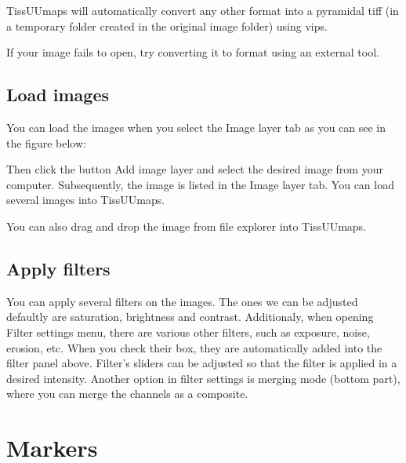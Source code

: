 \documentclass[letterpaper,10pt,english,openany,oneside]{sphinxmanual}
\begin{document}
\sphinxAtStartPar
TissUUmaps will automatically convert any other format into a pyramidal tiff (in a temporary  folder created in the original image folder) using vips.

\sphinxAtStartPar
If your image fails to open, try converting it to  format using an external tool.


\subsection{Load images}
\label{\detokenize{docs/starting/images:load-images}}
\sphinxAtStartPar
You can load the images when you select the Image layer tab as you can see in the figure below:

\sphinxAtStartPar
Then click the button Add image layer and select the desired image from your computer. Subsequently, the image is listed in the Image layer tab. You can load several images into TissUUmaps.

\sphinxAtStartPar
You can also drag and drop the image from file explorer into TissUUmaps.


\subsection{Apply filters}
\label{\detokenize{docs/starting/images:apply-filters}}
\sphinxAtStartPar
You can apply several filters on the images. The ones we can be adjusted defaultly are saturation, brightness and contrast. Additionaly, when opening Filter settings menu, there are various other filters, such as exposure, noise, erosion, etc. When you check their box, they are automatically added into the filter panel above. Filter’s sliders can be adjusted so that the filter is applied in a desired intensity. Another option in filter settings is merging mode (bottom part), where you can merge the channels as a composite.

\sphinxAtStartPar
{}

\sphinxstepscope


\section{Markers}
\label{\detokenize{docs/starting/markers:markers}}\label{\detokenize{docs/starting/markers::doc}}
\end{document}
